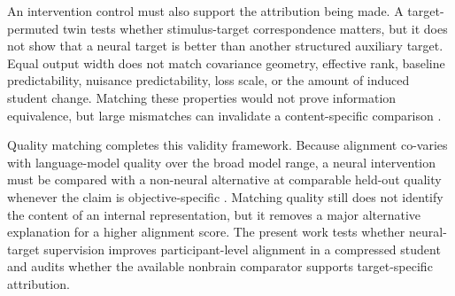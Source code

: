 An intervention control must also support the attribution being made.
A target-permuted twin tests whether stimulus-target correspondence matters, but it does not show that a neural target is better than another structured auxiliary target.
Equal output width does not match covariance geometry, effective rank, baseline predictability, nuisance predictability, loss scale, or the amount of induced student change.
Matching these properties would not prove information equivalence, but large mismatches can invalidate a content-specific comparison .

Quality matching completes this validity framework.
Because alignment co-varies with language-model quality over the broad model range, a neural intervention must be compared with a non-neural alternative at comparable held-out quality whenever the claim is objective-specific .
Matching quality still does not identify the content of an internal representation, but it removes a major alternative explanation for a higher alignment score.
The present work tests whether neural-target supervision improves participant-level alignment in a compressed student and audits whether the available nonbrain comparator supports target-specific attribution.
